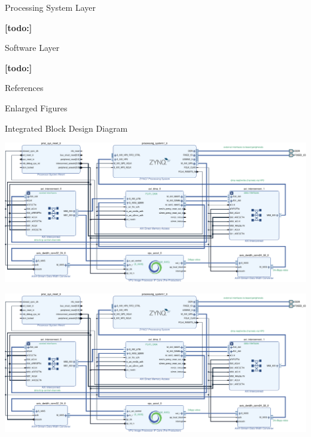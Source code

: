 \documentclass{matthijs}
\begin{document}
	\begin{hoofdstuk}{Processing System Layer}

		\textbf{[todo:]}

	\end{hoofdstuk}
	
	\begin{hoofdstuk}{Software Layer}

		\textbf{[todo:]}

	\end{hoofdstuk}
	
	\begin{hoofdstuk}{References}

		\printbibliography[heading=none]

	\end{hoofdstuk}

	\begin{appendices}
		\begin{hoofdstuk}{Enlarged Figures}
			\begin{paragraaf}{Integrated Block Design Diagram}
				\vspace{0.25cm}
				\centerline{\includegraphics[angle=90, origin=c, clip, trim=9.45cm 0 0 0, width=1.25\textwidth]{hw-block-diagram-crop-asset.pdf}}
				\clearpage
				\centerline{\includegraphics[angle=90, origin=c, clip, trim=0 0 9.45cm 0, width=1.25\textwidth]{hw-block-diagram-crop-asset.pdf}}
			\end{paragraaf}
		\end{hoofdstuk}
	\end{appendices}

	\clearpage
	\thispagestyle{empty}
	\addtocounter{page}{-1}
	\
	\clearpage
\end{document}

